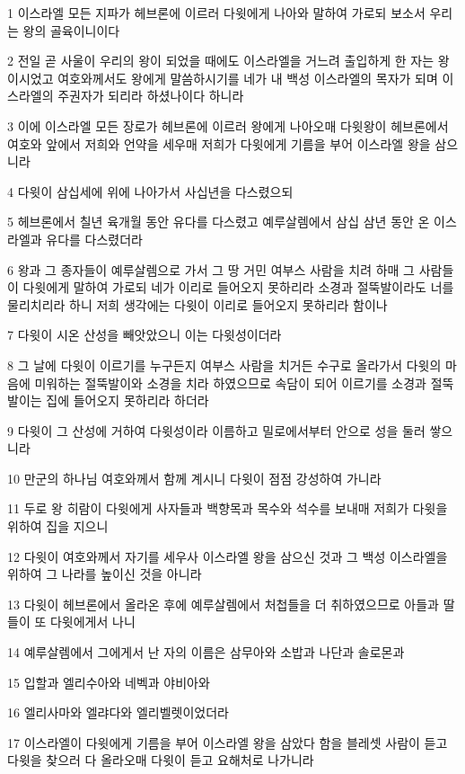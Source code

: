 \par 1 이스라엘 모든 지파가 헤브론에 이르러 다윗에게 나아와 말하여 가로되 보소서 우리는 왕의 골육이니이다
\par 2 전일 곧 사울이 우리의 왕이 되었을 때에도 이스라엘을 거느려 출입하게 한 자는 왕이시었고 여호와께서도 왕에게 말씀하시기를 네가 내 백성 이스라엘의 목자가 되며 이스라엘의 주권자가 되리라 하셨나이다 하니라
\par 3 이에 이스라엘 모든 장로가 헤브론에 이르러 왕에게 나아오매 다윗왕이 헤브론에서 여호와 앞에서 저희와 언약을 세우매 저희가 다윗에게 기름을 부어 이스라엘 왕을 삼으니라
\par 4 다윗이 삼십세에 위에 나아가서 사십년을 다스렸으되
\par 5 헤브론에서 칠년 육개월 동안 유다를 다스렸고 예루살렘에서 삼십 삼년 동안 온 이스라엘과 유다를 다스렸더라
\par 6 왕과 그 종자들이 예루살렘으로 가서 그 땅 거민 여부스 사람을 치려 하매 그 사람들이 다윗에게 말하여 가로되 네가 이리로 들어오지 못하리라 소경과 절뚝발이라도 너를 물리치리라 하니 저희 생각에는 다윗이 이리로 들어오지 못하리라 함이나
\par 7 다윗이 시온 산성을 빼앗았으니 이는 다윗성이더라
\par 8 그 날에 다윗이 이르기를 누구든지 여부스 사람을 치거든 수구로 올라가서 다윗의 마음에 미워하는 절뚝발이와 소경을 치라 하였으므로 속담이 되어 이르기를 소경과 절뚝발이는 집에 들어오지 못하리라 하더라
\par 9 다윗이 그 산성에 거하여 다윗성이라 이름하고 밀로에서부터 안으로 성을 둘러 쌓으니라
\par 10 만군의 하나님 여호와께서 함께 계시니 다윗이 점점 강성하여 가니라
\par 11 두로 왕 히람이 다윗에게 사자들과 백향목과 목수와 석수를 보내매 저희가 다윗을 위하여 집을 지으니
\par 12 다윗이 여호와께서 자기를 세우사 이스라엘 왕을 삼으신 것과 그 백성 이스라엘을 위하여 그 나라를 높이신 것을 아니라
\par 13 다윗이 헤브론에서 올라온 후에 예루살렘에서 처첩들을 더 취하였으므로 아들과 딸들이 또 다윗에게서 나니
\par 14 예루살렘에서 그에게서 난 자의 이름은 삼무아와 소밥과 나단과 솔로몬과
\par 15 입할과 엘리수아와 네벡과 야비아와
\par 16 엘리사마와 엘랴다와 엘리벨렛이었더라
\par 17 이스라엘이 다윗에게 기름을 부어 이스라엘 왕을 삼았다 함을 블레셋 사람이 듣고 다윗을 찾으러 다 올라오매 다윗이 듣고 요해처로 나가니라
